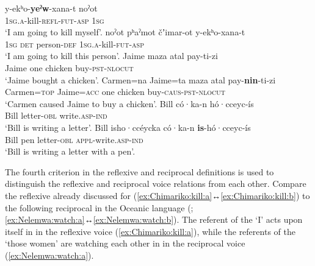 \ea {} \citep[121]{jany:2009}
\ea\label{ex:Chimariko:kill:a}
	\gll	y-ekʰo-\textbf{yeˀw}-xana-t					noˀot			\\
			\textsc{1sg.a}-kill-\textsc{refl-fut-asp} 	\textsc{1sg} 	\\
	\glt	‘I am going to kill myself’.
\ex\label{ex:Chimariko:kill:b}
	\gll	noˀot pʰaˀmot čʼimar-ot y-ekʰo-xana-t \\
			\textsc{1sg} \textsc{det} person-\textsc{def} \textsc{1sg.a}-kill-\textsc{fut-asp} \\
	\glt	‘I am going to kill this person’.
	\z 
\z
\ea {} \citep[159f.]{curnow:1997}
\ea\label{ex:AwaPit:buy:a}
	\gll	Jaime	maza	atal		pay-ti-zi					\\
			Jaime	one		chicken		buy-\textsc{pst-nlocut} 	\\
	\glt	‘Jaime bought a chicken’.
\ex\label{ex:AwaPit:buy:b} 
	\gll	Carmen=na Jaime=ta maza atal pay-\textbf{nin}-ti-zi 		\\
			Carmen=\textsc{top} Jaime=\textsc{acc} one chicken buy-\textsc{caus-pst-nlocut} \\
	\glt	‘Carmen caused Jaime to buy a chicken’.
	\z
\z
\ea {} \citep[392]{martin:2011}
\ea\label{ex:Creek:write:a}
	\gll	Bill 	có·ka-n 			hó·cceyc-ís				\\
			Bill 	letter-\textsc{obl}	write.\textsc{asp-ind}	\\
	\glt	‘Bill is writing a letter’.
	\ex\label{ex:Creek:write:b}
	\gll	Bill isho·ccéycka có·ka-n \textbf{is}-hó·cceyc-ís \\
			Bill pen letter-\textsc{obl} \textsc{appl}-write.\textsc{asp-ind} \\
	\glt	‘Bill is writing a letter with a pen’.
	\z
\z

The fourth criterion in the reflexive and reciprocal definitions is used to distinguish the reflexive and reciprocal voice relations from each other. Compare the reflexive  already discussed for  (\ref{ex:Chimariko:kill:a}↔\ref{ex:Chimariko:kill:b}) to the following reciprocal  in the Oceanic language  (; \ref{ex:Nelemwa:watch:a}↔\ref{ex:Nelemwa:watch:b}). The referent of the  ‘I’ acts upon itself in  in the  reflexive voice (\ref{ex:Chimariko:kill:a}), while the referents of the  ‘those women’ are watching each other in  in the  reciprocal voice (\ref{ex:Nelemwa:watch:a}).

